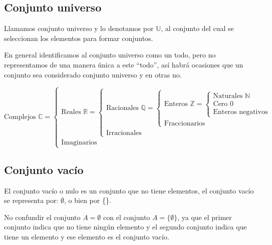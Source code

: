 \subsection{Conjunto universo}
Llamamos conjunto universo y lo denotamos por $\mathbb U$, al conjunto del cual se
seleccionan los elementos para formar conjuntos.

En general identificamos al conjunto universo como un todo, pero no
representamos de una manera única a este “todo”, así habrá ocasiones que un
conjunto sea considerado conjunto universo y en otras no.


    \begin{equation}
        \text{Complejos } \mathbb{ C}  =
        \left\lbrace\begin{array}{lll} 
            \text{Reales } \mathbb{ R} = \left\lbrace 
                \begin{array}{ll}
                    \text{Racionales } \mathbb{ Q} = \left\lbrace 
                    \begin{array}{l}
                        \text{Enteros } \mathbb{ Z} = \left\lbrace 
                        \begin{array}{l}
                            \text{Naturales } \mathbb{N} \\
                            \text{Cero } 0 \\
                            \text{Enteros negativos}
                        \end{array}\right.
                        \\
                        \text{Fraccionarios}
                    \end{array}\right.
                    \\
                    \text{Irracionales}
                \end{array}\right.
            \\ 
            \text{Imaginarios }
        \end{array}\right.
\end{equation}


\subsection{Conjunto vacío}

El conjunto vacío o nulo es un conjunto que no tiene elementos, el conjunto
vacío se representa por: $\emptyset$, o bien por \{\}.

No confundir el conjunto $A = \emptyset $ con el conjunto $ A = \{\emptyset\} $,
ya que el primer conjunto indica que no tiene ningún elemento y el segundo
conjunto indica que tiene un elemento y ese elemento es el conjunto vacío.


